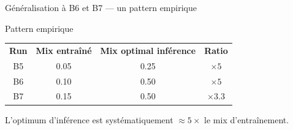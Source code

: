 \documentclass[10pt]{beamer}
\begin{document}
\begin{frame}{Généralisation à B6 et B7 --- un pattern empirique}

  \vspace{4pt}
  \begin{exampleblock}{Pattern empirique}
    \footnotesize
    \centering
    \begin{tabular}{c c c c}
      \textbf{Run} & \textbf{Mix entraîné} & \textbf{Mix optimal inférence} & \textbf{Ratio} \\
      B5 & 0.05 & 0.25 & $\times 5$ \\
      B6 & 0.10 & 0.50 & $\times 5$ \\
      B7 & 0.15 & 0.50 & $\times 3.3$ \\
    \end{tabular}
  \end{exampleblock}

  \begin{verdictbox}
    \centering\footnotesize
    L'optimum d'inférence est systématiquement $\approx 5 \times$ le mix d'entraînement.
  \end{verdictbox}
\end{frame}
\end{document}
